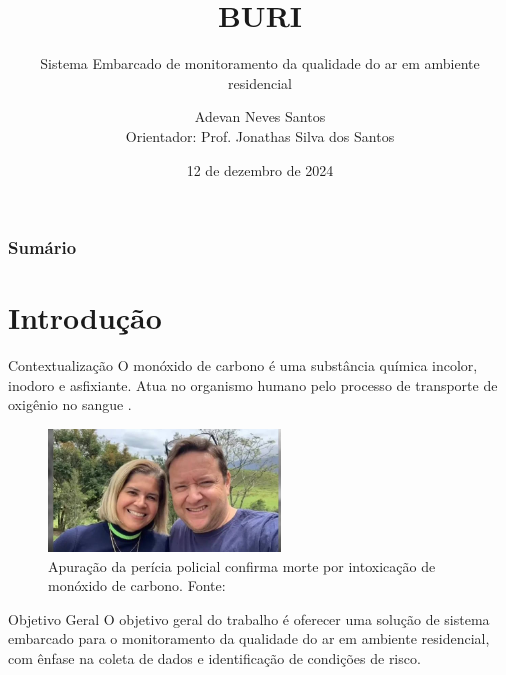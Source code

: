 \documentclass[12pt]{beamer}
\title{BURI}
\subtitle{Sistema Embarcado de monitoramento da qualidade do ar em ambiente residencial}
\author{Adevan Neves Santos \\ Orientador: Prof. Jonathas Silva dos Santos}
\date{12 de dezembro de 2024}
\begin{document}
    \maketitle

    \begin{frame}
        \frametitle{Sumário}
        \tableofcontents
    \end{frame}

    \section{Introdução}

    \begin{frame}{Contextualização}
        O monóxido de carbono é uma substância química incolor, inodoro e asfixiante. Atua no organismo humano pelo processo 
        de transporte de oxigênio no sangue \cite{carbon-monoxide-poisoning-varon}.
        \begin{figure}[ht]
            \centering
            \includegraphics[width=0.55\textwidth]{img/morte-co.jpg}
            \caption{Apuração da perícia policial confirma morte por intoxicação de monóxido de carbono. Fonte: \cite{noticia-manaus-fumaca}}\label{fig:context}
        \end{figure}         
    \end{frame}

    \begin{frame}{Objetivo Geral}
        O objetivo geral do trabalho é oferecer uma solução de sistema embarcado para o monitoramento
        da qualidade do ar em ambiente residencial, com ênfase na coleta de dados e identificação de
        condições de risco. 
    \end{frame}
\end{document}
